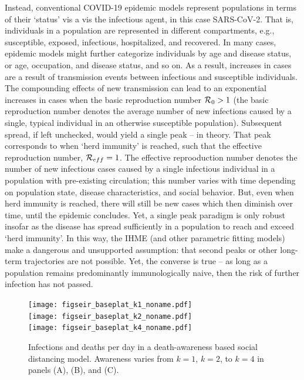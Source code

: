 Instead, conventional COVID-19 epidemic
models represent populations in terms of their `status' vis
a vis the infectious agent, in this case SARS-CoV-2.  That is, individuals
in a population are represented in different compartments, e.g.,
susceptible, exposed, infectious,
hospitalized, and recovered.  In many cases, epidemic models
might further categorize individuals by age and disease status, or age, occupation,
and disease status, and so on.  As a result, increases in cases
are a result of transmission events between infectious
and susceptible individuals.  The compounding effects 
of new transmission can lead to an exponential increases in cases 
when the basic reproduction number ${\cal{R}}_0>1$ (the
basic reproduction number denotes the average number of new
infections caused by a single, typical individual in an otherwise
susceptible population).  Subsequent
spread, if left unchecked, would yield a single peak -- in theory. That 
peak corresponds to when `herd immunity' is reached, such
that the effective reproduction number, ${\cal{R}}_{eff}=1$.
The effective reprooduction number denotes the number of new
infectious cases caused by a single infectious individual
in a population with pre-existing circulation; this number varies with
time depending on population state, disease characteristics, and 
social behavior.
But, even when herd immunity is reached, there will still be new cases which then
diminish over time, until the epidemic concludes.  
Yet, a single peak paradigm is
only robust insofar as the disease has spread
sufficiently in a population to reach and exceed `herd immunity'.
In this way, the IHME (and other parametric fitting models) make
a dangerous and unsupported assumption: that second peaks
or other long-term trajectories are not possible.  Yet, the converse
is true -- as long as a population remains predominantly immunologically
naive, then the risk of further infection has not passed. 
\begin{figure}[t!]
\begin{center}
\texttt{[image: figseir\_baseplat\_k1\_noname.pdf]}\\
\texttt{[image: figseir\_baseplat\_k2\_noname.pdf]}\\
\texttt{[image: figseir\_baseplat\_k4\_noname.pdf]}
\caption{Infections and deaths per day in a death-awareness based
social distancing model. Awareness varies from $k=1$, $k=2$, to $k=4$ 
in panels (A), (B), and (C).
\label{fig.ID_day}}
\end{center}
\end{figure}

